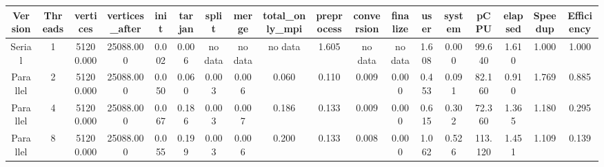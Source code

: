 \begin{tabular}{|c|c|c|c|c|c|c|c|c|c|c|c|c|c|c|c|c|c|}
\toprule
 Version &  Threads &  vertices &  vertices\_after &  init &  tarjan &   split &   merge & total\_only\_mpi &  preprocess & conversion & finalize &  user &  system &    pCPU &  elapsed &  Speedup &  Efficiency \\
\midrule
  Serial &        1 & 51200.000 &       25088.000 & 0.002 &   0.006 & no data & no data &        no data &       1.605 &    no data &  no data & 1.608 &   0.000 &  99.640 &    1.610 &    1.000 &       1.000 \\
Parallel &        2 & 51200.000 &       25088.000 & 0.050 &   0.060 &   0.003 &   0.006 &          0.060 &       0.110 &      0.009 &    0.000 & 0.453 &   0.091 &  82.160 &    0.910 &    1.769 &       0.885 \\
Parallel &        4 & 51200.000 &       25088.000 & 0.067 &   0.186 &   0.003 &   0.007 &          0.186 &       0.133 &      0.009 &    0.000 & 0.615 &   0.302 &  72.360 &    1.365 &    1.180 &       0.295 \\
Parallel &        8 & 51200.000 &       25088.000 & 0.055 &   0.199 &   0.003 &   0.006 &          0.200 &       0.133 &      0.008 &    0.000 & 1.062 &   0.526 & 113.120 &    1.451 &    1.109 &       0.139 \\
\bottomrule
\end{tabular}
